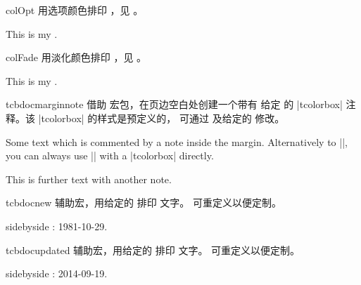 \begin{docCommand}{colOpt}{}
  用选项颜色排印 ，见 。
\begin{dispExample}
This is my .
\end{dispExample}
\end{docCommand}

\begin{docCommand}[doc new=2019-09-18]{colFade}{}
  用淡化颜色排印 ，见 。
\begin{dispExample}
This is my .
\end{dispExample}
\end{docCommand}


\begin{docCommand}[doc new=2014-09-19]{tcbdocmarginnote}{}
  借助  宏包，在页边空白处创建一个带有
  给定  的 |tcolorbox| 注释。该 |tcolorbox| 的样式是预定义的，
  可通过  及给定的  修改。
\begin{dispExample}
Some text
which is commented by a note inside the margin.
Alternatively to |\tcbdocmarginnote|, you can always use
|\marginnote| with a |tcolorbox| directly.\par
This is further text%
with another note.
\end{dispExample}
\end{docCommand}

\begin{docCommand}[doc new=2014-09-19]{tcbdocnew}{}
  辅助宏，用给定的  排印  文字。
  可重定义以便定制。
  \makeatletter\renewcommand*{\tcbdocnew}[1]{\kvtcb@text@new: #1}\makeatother%
\begin{dispExample*}{sidebyside}
\tcbdocnew{1981-10-29}.
\tcbdocmarginnote{\tcbdocnew{1978-02-09}}
\end{dispExample*}
\end{docCommand}

\begin{docCommand}[doc new=2014-09-19]{tcbdocupdated}{}
  辅助宏，用给定的  排印  文字。
  可重定义以便定制。
  \makeatletter\renewcommand*{\tcbdocupdated}[1]{\kvtcb@text@updated: #1}\makeatother%
\begin{dispExample*}{sidebyside}
\tcbdocupdated{2014-09-19}.
\end{dispExample*}
\end{docCommand}


